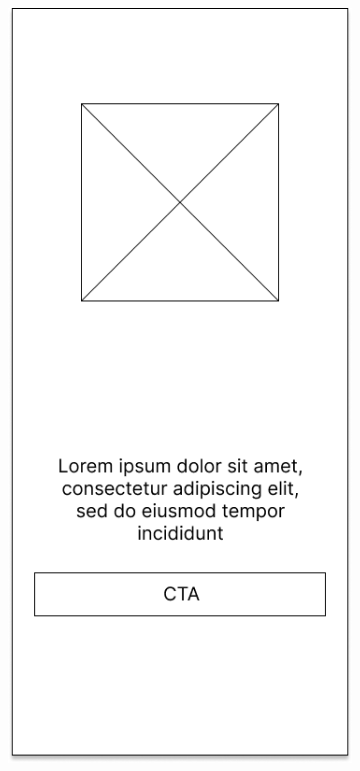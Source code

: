 \begin{figure}[H]
	\begin{subfigure}[b]{0.3\textwidth}
		\centering
	  \includegraphics[width=\linewidth]{contents/chapter-3/images/MF-login.png}

\end{subfigure}
\end{figure}

